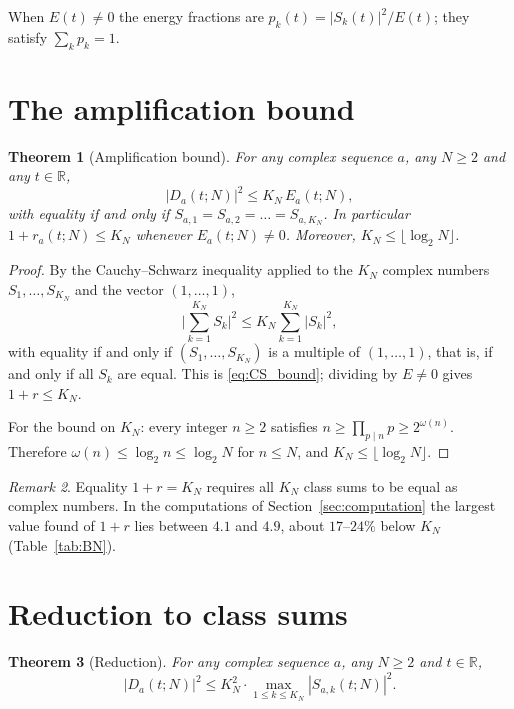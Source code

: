 \documentclass[11pt]{amsart}
\newtheorem{theorem}{Theorem}[section]
\theoremstyle{definition}
\theoremstyle{remark}
\newtheorem{remark}[theorem]{Remark}
\newcommand{\R}{\mathbb{R}}
\newcommand{\abs}[1]{\lvert #1 \rvert}
\begin{document}
When $E(t)\ne0$ the energy fractions are $p_k(t) = |S_k(t)|^2 / E(t)$;
they satisfy $\sum_k p_k = 1$.

\section{The amplification bound}\label{sec:thm1}

\begin{theorem}[Amplification bound]\label{thm:CS}
For any complex sequence $a$, any $N \ge 2$ and any $t \in \R$,
\begin{equation}\label{eq:CS_bound}
  |D_a(t;N)|^2 \le K_N\,E_a(t;N),
\end{equation}
with equality if and only if $S_{a,1}=S_{a,2}=\dots=S_{a,K_N}$.  In
particular $1 + r_a(t;N) \le K_N$ whenever $E_a(t;N)\ne0$.
Moreover, $K_N \le \lfloor \log_2 N \rfloor$.
\end{theorem}

\begin{proof}
By the Cauchy--Schwarz inequality applied to the $K_N$ complex numbers
$S_1, \ldots, S_{K_N}$ and the vector $(1,\dots,1)$,
\[
  \abs{\sum_{k=1}^{K_N} S_k}^2
  \le K_N \sum_{k=1}^{K_N} |S_k|^2,
\]
with equality if and only if $(S_1,\dots,S_{K_N})$ is a multiple of
$(1,\dots,1)$, that is, if and only if all $S_k$ are equal.  This is
\eqref{eq:CS_bound}; dividing by $E\neq0$ gives $1+r\le K_N$.

For the bound on $K_N$: every integer $n \ge 2$ satisfies
$n \ge \prod_{p \mid n} p \ge 2^{\omega(n)}$.  Therefore
$\omega(n) \le \log_2 n \le \log_2 N$ for $n\le N$, and
$K_N \le \lfloor \log_2 N \rfloor$.
\end{proof}

\begin{remark}
Equality $1+r = K_N$ requires all $K_N$ class sums to be equal as complex
numbers.  In the computations of Section~\ref{sec:computation} the largest
value found of $1+r$ lies between $4.1$ and $4.9$, about $17$--$24\%$
below $K_N$ (Table~\ref{tab:BN}).
\end{remark}

\section{Reduction to class sums}\label{sec:thm2}

\begin{theorem}[Reduction]\label{thm:reduction}
For any complex sequence $a$, any $N \ge 2$ and $t \in \R$,
\begin{equation}\label{eq:reduction}
  |D_a(t;N)|^2 \le K_N^2 \cdot
  \max_{1 \le k \le K_N} |S_{a,k}(t;N)|^2.
\end{equation}
\end{theorem}
\end{document}

